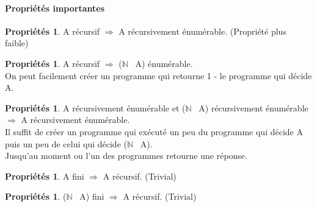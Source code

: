 \documentclass[11pt,a4paper]{article}
\newcommand{\N}{\mathbb{N}}
\theoremstyle{definition}
\newtheorem{myprop}[mydef]{Propriétés}
\begin{document}

\paragraph{Propriétés importantes}
\label{par:propri_t_s_importantes}
\begin{myprop}
	A récursif $\Rightarrow$ A récursivement énumérable. (Propriété plus
		faible)
\end{myprop}

\begin{myprop}
	A récursif $\Rightarrow$ ($\N$ \ A) énumérable.\\ On peut facilement créer
		un programme qui retourne 1 - le programme qui décide A.
\end{myprop}

\begin{myprop}
	A récursivement énumérable et ($\N$ \ A) récursivement énumérable 
		$\Rightarrow$ A récursivement énumérable.\\ Il suffit de créer un programme
		qui exécuté un peu du programme qui décide A puis un peu de celui qui
		décide ($\N$ \ A). \\Jusqu'au moment ou l'un des programmes retourne une
		réponse.
\end{myprop}

\begin{myprop}
	A fini $\Rightarrow$ A récursif. (Trivial)
\end{myprop}

\begin{myprop}
	($\N$ \ A) fini $\Rightarrow$ A récursif. (Trivial)
\end{myprop}


\end{document}
